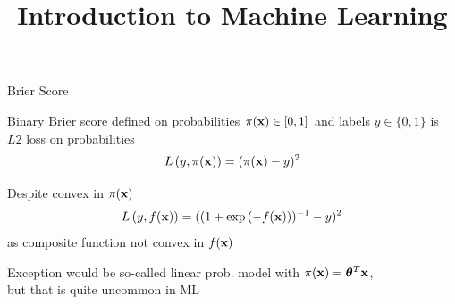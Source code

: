 \documentclass[11pt,compress,t,notes=noshow, xcolor=table]{beamer}
\title{Introduction to Machine Learning}
\begin{document}
    


\begin{vbframe}{Brier Score}

\begin{footnotesize}

\begin{itemizeM}
\item Binary Brier score defined on probabilities $\pi(\mathbf{x}) \in [0, 1]$ and labels $y \in \{0, 1\}$ is $L2$ loss on probabilities $$L\left(y, \pi(\mathbf{x})\right) = (\pi(\mathbf{x}) - y)^2$$
\item Despite convex in $\pi(\mathbf{x})$ $$L\left(y, f(\mathbf{x})\right)=((1+\exp{(-f(\mathbf{x}))})^{-1}-y)^2$$ as composite function not convex in $f(\mathbf{x})$
\item Exception would be so-called linear prob. model with $\pi(\mathbf{x}) = \bm{\theta}^T \mathbf{x}$,\\
but that is quite uncommon in ML 
\end{itemizeM}


\lz 


\end{footnotesize}



\end{vbframe}
\end{document}
